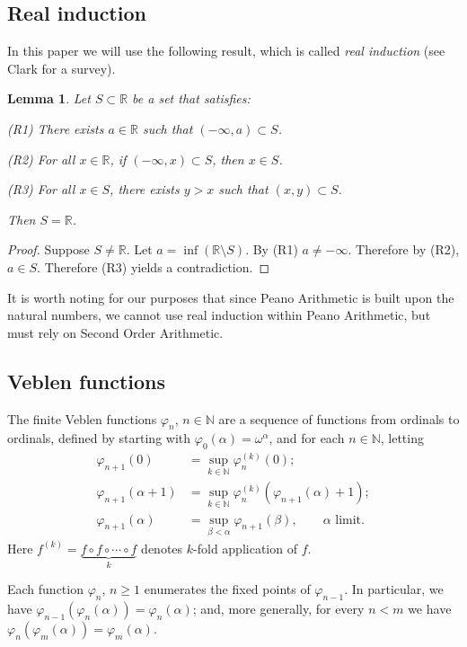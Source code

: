 \documentclass{article}
\newtheorem{Lemma}[Theorem]{Lemma}
\theoremstyle{definition}
\begin{document}
\subsection{Real induction}
In this paper we will use the following result, which is called \emph{real induction} (see Clark \cite{L.Clark} for a survey).
\begin{Lemma}
\label{real induction}
Let $S \subset \mathbb{R}$ be a set that satisfies:

(R1) There exists $a \in \mathbb{R} $ such that $(-\infty,a) \subset S $.

(R2) For all $x \in \mathbb{R}$, if $(-\infty, x) \subset S$, then $x \in S$.

(R3) For all $x \in S $, there exists $y > x$ such that $(x, y) \subset S$. 

Then $S = \mathbb{R}$. 
\end{Lemma}
\begin{proof}
Suppose $S \neq \mathbb{R}$. Let $a= \inf(\mathbb{R}\setminus S)$. By (R1) $a\neq - \infty$. Therefore by (R2), $a \in S$. Therefore (R3) yields a contradiction.
\end{proof}

It is worth noting for our purposes that since  Peano Arithmetic is built upon the natural numbers, we cannot use real induction within Peano Arithmetic, but must rely on Second Order Arithmetic.

\subsection{Veblen functions}\label{subsec_veblen}

    The finite Veblen functions $\varphi_n$, $n\in\mathbb N$ are a sequence of functions from ordinals to ordinals, defined by starting with $\varphi_0(\alpha) = \omega^\alpha$, and for each $n\in\mathbb N$, letting
    \begin{align*}
    \varphi_{n+1}(0)&=\sup_{k\in\mathbb N}\varphi_n^{(k)}(0);\\
    \varphi_{n+1}(\alpha+1)&=\sup_{k\in\mathbb N}\varphi_n^{(k)}(\varphi_{n+1}(\alpha)+1);\\
    \varphi_{n+1}(\alpha) &=\sup_{\beta<\alpha} \varphi_{n+1}(\beta),\qquad\text{$\alpha$ limit}.
    \end{align*}
    Here $f^{(k)} = \underbrace{f\circ f\circ \cdots\circ f}_k$ denotes $k$-fold application of $f$.

    Each function $\varphi_n$, $n\ge 1$ enumerates the fixed points of $\varphi_{n-1}$. In particular, we have $\varphi_{n-1}(\varphi_n(\alpha))=\varphi_n(\alpha)$; and, more generally, for every $n<m$ we have $\varphi_n(\varphi_m(\alpha))=\varphi_m(\alpha)$.
    
\end{document}
